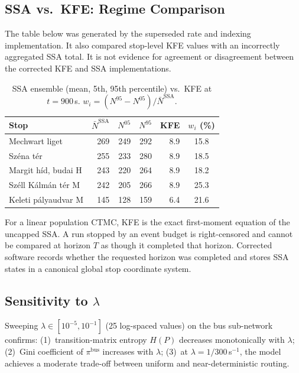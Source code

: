 \documentclass[11pt,a4paper]{article}
\theoremstyle{plain}
\theoremstyle{definition}
\theoremstyle{remark}
\begin{document}
\subsection{SSA vs.\ KFE: Regime Comparison}

The table below was generated by the superseded rate and indexing
implementation.  It also compared stop-level KFE values with an incorrectly
aggregated SSA total.  It is not evidence for agreement or disagreement
between the corrected KFE and SSA implementations.

\begin{table}[h]
\centering
\caption{SSA ensemble (mean, 5th, 95th percentile) vs.\ KFE at $t=900$\,s.
  $w_i=(N^{95}-N^{05})/\bar{N}^{\mathrm{SSA}}$.}
\label{tab:ssa-kfe}
\begin{tabular}{lrrrrc}
\toprule
Stop & $\bar{N}^{\mathrm{SSA}}$ & $N^{05}$ & $N^{95}$ & KFE & $w_i$ (\%) \\
\midrule
Mechwart liget            & 269 & 249 & 292 & 8.9 & 15.8 \\
Sz\'ena t\'er             & 255 & 233 & 280 & 8.9 & 18.5 \\
Margit h\'id, budai H     & 243 & 220 & 264 & 8.9 & 18.2 \\
Sz\'ell K\'alm\'an t\'er M & 242 & 205 & 266 & 8.9 & 25.3 \\
Keleti p\'alyaudvar M     & 145 & 128 & 159 & 6.4 & 21.6 \\
\bottomrule
\end{tabular}
\end{table}

For a linear population CTMC, KFE is the exact first-moment equation of the
uncapped SSA.  A run stopped by an event budget is right-censored and cannot
be compared at horizon $T$ as though it completed that horizon.  Corrected
software records whether the requested horizon was completed and stores SSA
states in a canonical global stop coordinate system.

\subsection{Sensitivity to $\lambda$}

Sweeping $\lambda\in[10^{-5},10^{-1}]$ (25 log-spaced values) on the bus
sub-network confirms: (1)~transition-matrix entropy $H(P)$ decreases
monotonically with $\lambda$; (2)~Gini coefficient of $\pi^{\mathrm{bus}}$
increases with $\lambda$; (3)~at $\lambda=1/300$\,s$^{-1}$, the model achieves
a moderate trade-off between uniform and near-deterministic routing.
\end{document}
